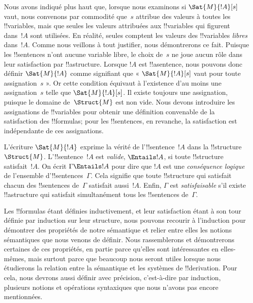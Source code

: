 \documentclass[../../../include/open-logic-section]{subfiles}
\begin{document}


Nous avons indiqué plus haut que, lorsque nous examinons si
$\Sat{M}{!A}[s]$ vaut, nous convenons par commodité que~$s$ attribue
des valeurs à toutes les !!{variable}s, mais que seules les valeurs
attribuées aux !!{variable}s qui figurent dans~$!A$ sont utilisées. En
réalité, seules comptent les valeurs des !!{variable}s \emph{libres}
dans~$!A$. Comme nous veillons à tout justifier, nous démontrerons ce
fait. Puisque les !!{sentence}s n'ont aucune variable libre, le choix
de~$s$ ne joue aucun rôle dans leur satisfaction par
!!a{structure}. Lorsque $!A$ est !!a{sentence}, nous pouvons donc
définir $\Sat{M}{!A}$ comme signifiant que
« $\Sat{M}{!A}[s]$ vaut pour toute assignation~$s$ ». Or cette
condition équivaut à l'existence d'au moins une assignation~$s$ telle
que $\Sat{M}{!A}[s]$. Il existe toujours une assignation, puisque le
domaine de~$\Struct{M}$ est non vide. Nous devons introduire les assignations de
!!{variable}s pour obtenir une définition convenable de la satisfaction
des !!{formula}s; pour les !!{sentence}s, en revanche, la satisfaction
est indépendante de ces assignations.

L'écriture $\Sat{M}{!A}$ exprime la vérité de l'!!{sentence}~$!A$
dans la !!{structure}~$\Struct{M}$. L'!!{sentence}~$!A$ est
\emph{valide}, $\Entails !A$, si toute !!{structure} satisfait~$!A$.
On écrit $\Gamma \Entails !A$ pour dire que $!A$ est une
\emph{conséquence logique} de l'ensemble d'!!{sentence}s~$\Gamma$.
Cela signifie que toute !!{structure} qui satisfait chacun des
!!{sentence}s de~$\Gamma$ satisfait aussi~$!A$. Enfin, $\Gamma$ est
\emph{satisfaisable} s'il existe !!a{structure} qui satisfait
simultanément tous les !!{sentence}s de~$\Gamma$.

Les !!{formula}s étant définies inductivement, et leur satisfaction
étant à son tour définie par induction sur leur structure, nous pouvons
recourir à l'induction pour démontrer des propriétés de notre
sémantique et relier entre elles les notions sémantiques que nous
venons de définir. Nous rassemblerons et démontrerons certaines de ces
propriétés, en partie parce qu'elles sont intéressantes en elles-mêmes,
mais surtout parce que beaucoup nous seront utiles lorsque nous
étudierons la relation entre la sémantique et les systèmes de
!!{derivation}. Pour cela, nous devrons aussi définir avec précision,
c'est-à-dire par induction, plusieurs notions et opérations syntaxiques
que nous n'avons pas encore mentionnées.
\end{document}
